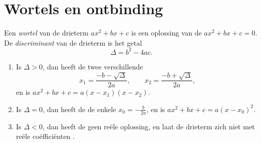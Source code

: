 \section{Wortels en ontbinding}

\begin{definition}\label{def:g11:quad:discriminant}
Een \emph{wortel} van de drieterm $ax^2+bx+c$ is een oplossing
van de  $ax^2 + bx + c = 0$. De
\emph{discriminant} van de drieterm is het getal
\[
\Delta = b^2 - 4ac .
\]
\end{definition}

\begin{theorem}[$ax^2+bx+c=0$ oplossen]\label{thm:g11:quad:roots}
\begin{enumerate}
  \item Is $\Delta > 0$, dan heeft de  twee verschillende
        \[
        x_1 = \frac{-b - \sqrt{\Delta}}{2a},
        \qquad
        x_2 = \frac{-b + \sqrt{\Delta}}{2a},
        \]
        en is $ax^2+bx+c = a(x - x_1)(x - x_2)$.
  \item Is $\Delta = 0$, dan heeft de  de enkele 
        $x_0 = -\frac{b}{2a}$, en is $ax^2+bx+c = a(x - x_0)^2$.
  \item Is $\Delta < 0$, dan heeft de  geen reële oplossing, en
        laat de drieterm zich niet met reële coëfficiënten .
\end{enumerate}
\end{theorem}

